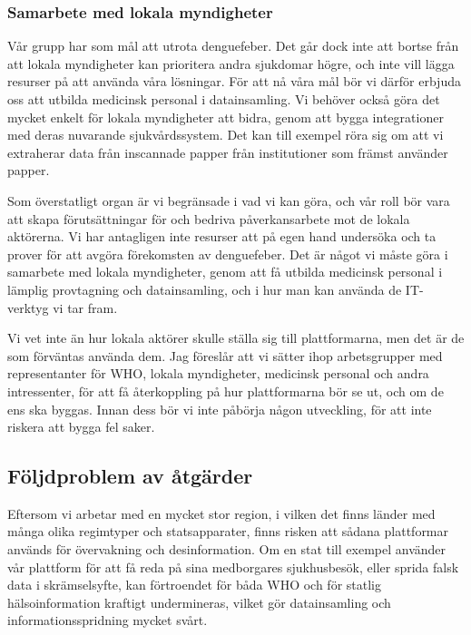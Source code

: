 \documentclass{article}
\begin{document}
\subsubsection{Samarbete med lokala myndigheter}
Vår grupp har som mål att utrota denguefeber. Det går dock inte att bortse från att lokala myndigheter kan prioritera andra sjukdomar högre, och inte vill lägga resurser på att använda våra lösningar. För att nå våra mål bör vi därför erbjuda oss att utbilda medicinsk personal i datainsamling. Vi behöver också göra det mycket enkelt för lokala myndigheter att bidra, genom att bygga integrationer med deras nuvarande sjukvårdssystem. Det kan till exempel röra sig om att vi extraherar data från inscannade papper från institutioner som främst använder papper.

Som överstatligt organ är vi begränsade i vad vi kan göra, och vår roll bör vara att skapa förutsättningar för och bedriva påverkansarbete mot de lokala aktörerna. Vi har antagligen inte resurser att på egen hand undersöka och ta prover för att avgöra förekomsten av denguefeber. Det är något vi måste göra i samarbete med lokala myndigheter, genom att få utbilda medicinsk personal i lämplig provtagning och datainsamling, och i hur man kan använda de IT-verktyg vi tar fram.

Vi vet inte än hur lokala aktörer skulle ställa sig till plattformarna, men det är de som förväntas använda dem. Jag föreslår att vi sätter ihop arbetsgrupper med representanter för WHO, lokala myndigheter, medicinsk personal och andra intressenter, för att få återkoppling på hur plattformarna bör se ut, och om de ens ska byggas. Innan dess bör vi inte påbörja någon utveckling, för att inte riskera att bygga fel saker.

\subsection{Följdproblem av åtgärder}

Eftersom vi arbetar med en mycket stor region, i vilken det finns länder med många olika regimtyper och statsapparater, finns risken att sådana plattformar används för övervakning och desinformation. Om en stat till exempel använder vår plattform för att få reda på sina medborgares sjukhusbesök, eller sprida falsk data i skrämselsyfte, kan förtroendet för båda WHO och för statlig hälsoinformation kraftigt undermineras, vilket gör datainsamling och informationsspridning mycket svårt.
\end{document}
